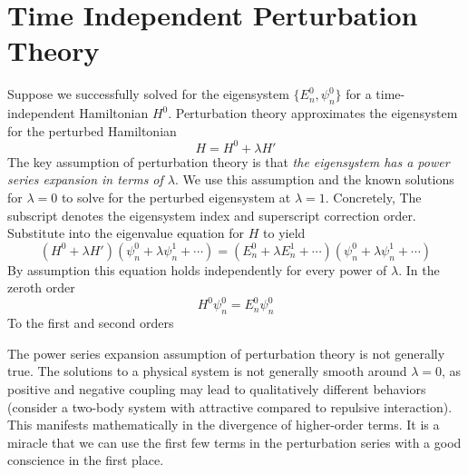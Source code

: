 \section{Time Independent Perturbation Theory}
Suppose we successfully solved for the eigensystem $\{E_n^0, \psi_n^0\}$ 
for a time-independent Hamiltonian $H^0$. Perturbation theory
approximates the eigensystem for the perturbed Hamiltonian 
\[ 
    H = H^0 + \lambda H'
\] 
The key assumption of perturbation theory 
is that \textit{the eigensystem has a power series expansion 
in terms of $\lambda$}. We use this assumption and 
the known solutions for $\lambda=0$ to solve 
for the perturbed eigensystem at $\lambda=1$. Concretely, 
The subscript denotes the eigensystem index and superscript 
correction order. Substitute into the eigenvalue equation for $H$ to yield 
\[
    (H^0 + \lambda H')(\psi_n^0 + \lambda \psi_n^1 + \cdots)
    = (E_n^0 + \lambda E_n^1 + \cdots)(\psi_n^0 + \lambda \psi_n^1 + \cdots)
\]
By assumption this equation holds independently for every power of $\lambda$. 
In the zeroth order 
\[ 
    H^0\psi_n^0 = E_n^0 \psi_n^0
\] 
To the first and second orders 
\begin{remark}
    The power series expansion assumption of perturbation theory is not generally true. 
    The solutions to a physical system is not generally smooth around $\lambda=0$, as 
    positive and negative coupling may lead to qualitatively different behaviors 
    (consider a two-body system with attractive compared to repulsive interaction). 
    This manifests mathematically in the divergence of higher-order terms. It is a 
    miracle that we can use the first few terms in the perturbation series with a good 
    conscience in the first place. 
\end{remark}



